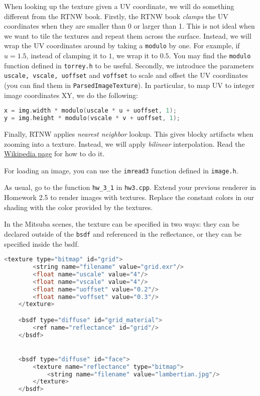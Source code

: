 When looking up the texture given a UV coordinate, we will do something different from the RTNW book. Firstly, the RTNW book \emph{clamps} the UV coordinates when they are smaller than 0 or larger than 1. This is not ideal when we want to tile the textures and repeat them across the surface. Instead, we will wrap the UV coordinates around by taking a \lstinline{modulo} by one. For example, if $u = 1.5$, instead of clamping it to $1$, we wrap it to $0.5$. You may find the \lstinline{modulo} function defined in \lstinline{torrey.h} to be useful. Secondly, we introduce the parameters \lstinline{uscale, vscale, uoffset} and \lstinline{voffset} to scale and offset the UV coordinates (you can find them in \lstinline{ParsedImageTexture}). In particular, to map UV to integer image coordinates XY, we do the following:
\begin{lstlisting}[language=C++]
x = img.width * modulo(uscale * u + uoffset, 1);
y = img.height * modulo(vscale * v + uoffset, 1);
\end{lstlisting}
Finally, RTNW applies \emph{nearest neighbor} lookup. This gives blocky artifacts when zooming into a texture. Instead, we will apply \emph{bilinear} interpolation. Read the \href{https://en.wikipedia.org/wiki/Bilinear_interpolation}{Wikipedia page} for how to do it.

For loading an image, you can use the \lstinline{imread3} function defined in \lstinline{image.h}.

As usual, go to the function \lstinline{hw_3_1} in \lstinline{hw3.cpp}. Extend your previous renderer in Homework 2.5 to render images with textures. Replace the constant colors in our shading with the color provided by the textures.

In the Mitsuba scenes, the texture can be specified in two ways: they can be declared outside of the \lstinline{bsdf} and referenced in the reflectance, or they can be specified inside the bsdf.
\begin{lstlisting}[language=C++]
	<texture type="bitmap" id="grid">
		<string name="filename" value="grid.exr"/>
		<float name="uscale" value="4"/>
		<float name="vscale" value="4"/>
		<float name="uoffset" value="0.2"/>
		<float name="voffset" value="0.3"/>
	</texture>

	<bsdf type="diffuse" id="grid_material">
		<ref name="reflectance" id="grid"/>
	</bsdf>


	<bsdf type="diffuse" id="face">
		<texture name="reflectance" type="bitmap">
			<string name="filename" value="lambertian.jpg"/>
		</texture>
	</bsdf>
\end{lstlisting}

